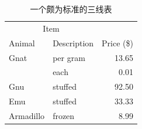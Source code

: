 


\begin{table}[!hpt]
  \caption[一个颇为标准的三线表]{一个颇为标准的三线表\footnotemark}
  \label{tab:firstone}
  \centering
  \begin{tabular}{@{}llr@{}} \toprule
    \multicolumn{2}{c}{Item} \\ \cmidrule(r){1-2}
    Animal & Description & Price (\$)\\ \midrule
    Gnat  & per gram  & 13.65 \\
          & each      & 0.01 \\
    Gnu   & stuffed   & 92.50 \\
    Emu   & stuffed   & 33.33 \\
    Armadillo & frozen & 8.99 \\ \bottomrule
  \end{tabular}
\end{table}



